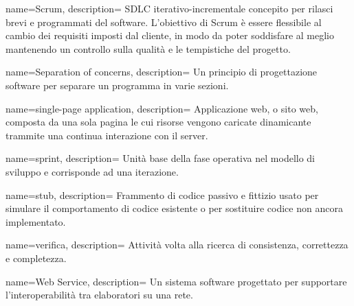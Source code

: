  {
name=Scrum,
description={
SDLC iterativo-incrementale concepito per rilasci brevi e programmati del
software. L'obiettivo di Scrum è essere flessibile al cambio dei requisiti
imposti dal cliente, in modo da poter soddisfare al meglio mantenendo un
controllo sulla qualità e le tempistiche del progetto.
}
}

 {
name=Separation of concerns,
description={
Un principio di progettazione software per separare un programma in varie
sezioni.
}
}

 {
name=single-page application,
description={
Applicazione web, o sito web, composta da una sola pagina le cui risorse vengono
caricate dinamicante trammite una continua interazione con il server.
}
}

 {
name=sprint,
description={
Unità base della fase operativa nel modello di sviluppo  e
corrisponde ad una iterazione.
}
}

 {
name=stub,
description={
Frammento di codice passivo e fittizio usato per simulare il comportamento di
codice esistente o per sostituire codice non ancora implementato.
}
}

 {
name=verifica,
description={
Attività volta alla ricerca di consistenza, correttezza e completezza.
}
}

 {
name=Web Service,
description={
Un sistema software progettato per supportare l'interoperabilità tra elaboratori
su una rete.
}
}

\makeglossaries

